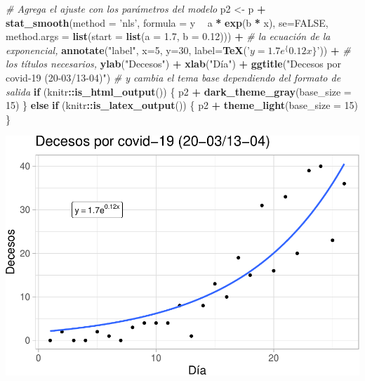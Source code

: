 \documentclass[]{article}
\newenvironment{Shaded}{\begin{snugshade}}{\end{snugshade}}
\newcommand{\CommentTok}[1]{\textcolor[rgb]{0.56,0.35,0.01}{\textit{#1}}}
\newcommand{\ControlFlowTok}[1]{\textcolor[rgb]{0.13,0.29,0.53}{\textbf{#1}}}
\newcommand{\DataTypeTok}[1]{\textcolor[rgb]{0.13,0.29,0.53}{#1}}
\newcommand{\DecValTok}[1]{\textcolor[rgb]{0.00,0.00,0.81}{#1}}
\newcommand{\FloatTok}[1]{\textcolor[rgb]{0.00,0.00,0.81}{#1}}
\newcommand{\KeywordTok}[1]{\textcolor[rgb]{0.13,0.29,0.53}{\textbf{#1}}}
\newcommand{\NormalTok}[1]{#1}
\newcommand{\OperatorTok}[1]{\textcolor[rgb]{0.81,0.36,0.00}{\textbf{#1}}}
\newcommand{\OtherTok}[1]{\textcolor[rgb]{0.56,0.35,0.01}{#1}}
\newcommand{\StringTok}[1]{\textcolor[rgb]{0.31,0.60,0.02}{#1}}
\begin{document}
\begin{Shaded}
\begin{Highlighting}[]
\CommentTok{# Agrega el ajuste con los parámetros del modelo}
\NormalTok{p2 <-}\StringTok{ }\NormalTok{p }\OperatorTok{+}
\StringTok{  }\KeywordTok{stat_smooth}\NormalTok{(}\DataTypeTok{method =} \StringTok{'nls'}\NormalTok{, }\DataTypeTok{formula =}\NormalTok{ y }\OperatorTok{~}\StringTok{ }\NormalTok{a }\OperatorTok{*}\StringTok{ }\KeywordTok{exp}\NormalTok{(b }\OperatorTok{*}\StringTok{ }\NormalTok{x), }\DataTypeTok{se=}\OtherTok{FALSE}\NormalTok{,}
              \DataTypeTok{method.args =} \KeywordTok{list}\NormalTok{(}\DataTypeTok{start =} \KeywordTok{list}\NormalTok{(}\DataTypeTok{a =} \FloatTok{1.7}\NormalTok{, }\DataTypeTok{b =}  \FloatTok{0.12}\NormalTok{))) }\OperatorTok{+}
\CommentTok{# la ecuación de la exponencial,}
\StringTok{      }\KeywordTok{annotate}\NormalTok{(}\StringTok{"label"}\NormalTok{, }\DataTypeTok{x=}\DecValTok{5}\NormalTok{, }\DataTypeTok{y=}\DecValTok{30}\NormalTok{, }\DataTypeTok{label=}\KeywordTok{TeX}\NormalTok{(}\StringTok{'$y  =  1.7  e^\{0.12  x \}$'}\NormalTok{)) }\OperatorTok{+}
\CommentTok{# los títulos necesarios,}
\StringTok{  }\KeywordTok{ylab}\NormalTok{(}\StringTok{"Decesos"}\NormalTok{) }\OperatorTok{+}\StringTok{ }\KeywordTok{xlab}\NormalTok{(}\StringTok{"Día"}\NormalTok{) }\OperatorTok{+}\StringTok{  }\KeywordTok{ggtitle}\NormalTok{(}\StringTok{"Decesos por covid-19 (20-03/13-04)"}\NormalTok{) }
\CommentTok{# y cambia el tema base dependiendo del formato de salida}
\ControlFlowTok{if}\NormalTok{ (knitr}\OperatorTok{::}\KeywordTok{is_html_output}\NormalTok{()) \{}
\NormalTok{  p2 }\OperatorTok{+}\StringTok{ }\KeywordTok{dark_theme_gray}\NormalTok{(}\DataTypeTok{base_size =} \DecValTok{15}\NormalTok{)}
\NormalTok{\} }\ControlFlowTok{else} \ControlFlowTok{if}\NormalTok{ (knitr}\OperatorTok{::}\KeywordTok{is_latex_output}\NormalTok{()) \{}
\NormalTok{  p2 }\OperatorTok{+}\StringTok{ }\KeywordTok{theme_light}\NormalTok{(}\DataTypeTok{base_size =} \DecValTok{15}\NormalTok{)}
\NormalTok{\}}
\end{Highlighting}
\end{Shaded}

\includegraphics{covid19_mx_files/figure-latex/unnamed-chunk-6-1.pdf}
\end{document}
